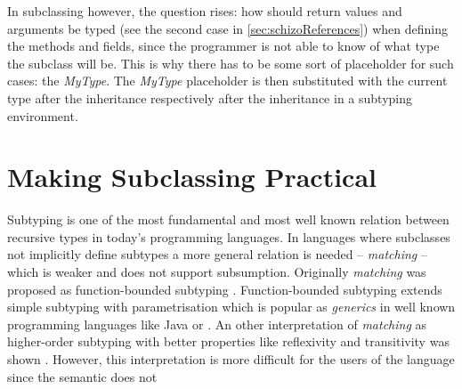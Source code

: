 In subclassing however, the question rises: how should return values and
arguments be typed (see the second case in \cref{sec:schizoReferences})
when defining the methods and fields, since the programmer is not able to
know of what type the subclass will be. This is why there has to be some
sort of placeholder for such cases: the \emph{MyType}. The \emph{MyType}
placeholder is then substituted with the current type after the
inheritance respectively after the inheritance in a subtyping environment.

\chapter{Making Subclassing Practical}
Subtyping is one of the most fundamental and most well known relation
between recursive types in today's programming languages. In languages
where subclasses not implicitly define subtypes a more general
relation is needed -- \emph{matching} -- which is weaker and does
not support subsumption. Originally \emph{matching} was proposed
as function-bounded subtyping \cite{canning_f-bounded_1989}. Function-bounded
subtyping extends simple subtyping with parametrisation which is popular as
\emph{generics} in well known programming languages like Java or \cs
\cite{barron-estrada_inheritance_2003}. An other interpretation of
\emph{matching} as higher-order subtyping with better properties like
reflexivity and transitivity was shown \cite{abadi_subtyping_1996}. However,
this interpretation is more difficult for the users of the language since
the semantic does not 

